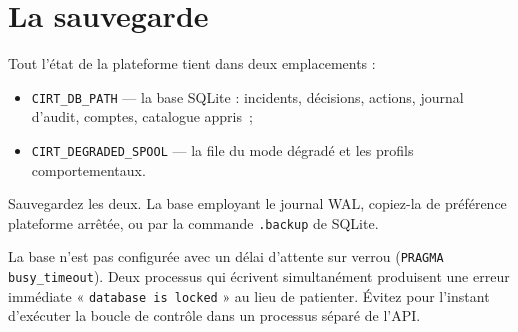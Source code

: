 \section{La sauvegarde}

Tout l'état de la plateforme tient dans deux emplacements :

\begin{itemize}[leftmargin=*]
  \item \texttt{CIRT\_DB\_PATH} — la base SQLite : incidents, décisions,
        actions, journal d'audit, comptes, catalogue appris~;
  \item \texttt{CIRT\_DEGRADED\_SPOOL} — la file du mode dégradé et les profils
        comportementaux.
\end{itemize}

Sauvegardez les deux. La base employant le journal WAL, copiez-la de préférence
plateforme arrêtée, ou par la commande \texttt{.backup} de SQLite.

\begin{tcolorbox}[colback=red!4!white, colframe=darkred,
  title=\textbf{Limitation connue}, fonttitle=\bfseries, boxrule=0.6pt]
La base n'est pas configurée avec un délai d'attente sur verrou
(\texttt{PRAGMA busy\_timeout}). Deux processus qui écrivent simultanément
produisent une erreur immédiate « \texttt{database is locked} » au lieu de
patienter. Évitez pour l'instant d'exécuter la boucle de contrôle dans un
processus séparé de l'API.
\end{tcolorbox}
